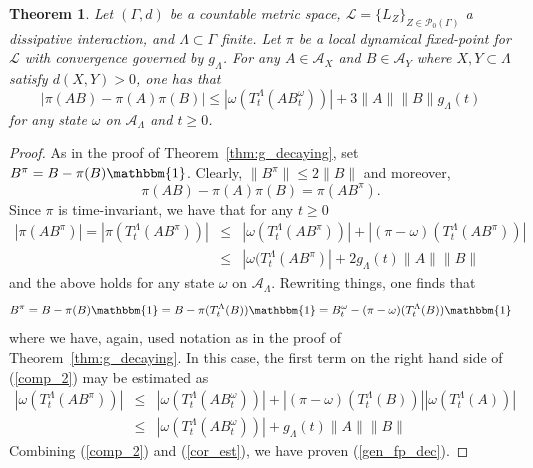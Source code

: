 \documentclass{article}
\newcommand{\A}{\mathcal{A}}
\newcommand{\one}{\mathbbm{1}}
\newcommand{\<}{\langle}
\renewcommand{\>}{\rangle}
\numberwithin{equation}{section}
\newtheorem{thm}{Theorem}[section]
\theoremstyle{definition}
\begin{document}
\begin{thm}\label{thm:steadystate1}
Let $(\Gamma, d)$ be a countable metric space, $\mathscr{L} = \{L_Z \}_{Z \in \mathcal{P}_0(\Gamma)}$ a dissipative interaction,
and $\Lambda \subset \Gamma$ finite. Let $\pi$ be a local dynamical fixed-point for $\mathscr{L}$ with 
convergence governed by $g_{\Lambda}$. For any $A \in \A_X$ and $B \in \A_Y$ where $X,Y \subset \Lambda$ 
satisfy $d(X,Y) >0$, one has that
\begin{equation} \label{gen_fp_dec}
            |\pi(AB) - \pi(A) \pi(B)| \leq  | \omega(T_t^{\Lambda}(AB_t^{\omega}))| + 3 \| A \| \| B \| g_{\Lambda}(t) 
\end{equation}
for any state $\omega$ on $\A_{\Lambda}$ and $t \geq 0$.
\end{thm}
\begin{proof}
As in the proof of Theorem~\ref{thm:g_decaying}, set $B^\pi = B- \pi(B)\one$. Clearly, $\|B^\pi\|\le 2 \|B\|$ and moreover,
\begin{equation}
\pi(AB) - \pi(A) \pi(B) = \pi(AB^\pi).
\end{equation}
Since $\pi$ is time-invariant, we have that for any $t \geq 0$ 
\begin{eqnarray} \label{comp_2}
| \pi(AB^\pi)|  = | \pi(T_t^{\Lambda}(AB^\pi))| & \leq & | \omega(T_t^{\Lambda}(AB^\pi))| + | (\pi - \omega)(T_t^{\Lambda}(AB^\pi))| \nonumber \\
& \leq &  | \omega(T_t^{\Lambda}(AB^\pi)| + 2 g_{\Lambda}(t) \| A \| \| B \|  
\end{eqnarray}
and the above holds for any state $\omega$ on $\A_{\Lambda}$.
Rewriting things, one finds that 
\begin{equation}
B^\pi = B - \pi(B) \one = B - \pi(T_t^{\Lambda}(B)) \one = B_t^{\omega} - (\pi - \omega )(T_t^{\Lambda}(B)) \one
\end{equation}
where we have, again, used notation as in the proof of Theorem~\ref{thm:g_decaying}. 
In this case, the first term on the right hand side of (\ref{comp_2}) may be estimated as
\begin{eqnarray} \label{cor_est}
 | \omega(T_t^{\Lambda}(AB^\pi))| & \leq &  | \omega(T_t^{\Lambda}(AB_t^{\omega}))| + |(\pi - \omega)(T_t^{\Lambda}(B))| | \omega(T_t^{\Lambda}(A))|  \nonumber \\
 & \leq & | \omega(T_t^{\Lambda}(AB_t^{\omega}))| +g_{\Lambda}(t) \| A \| \| B \|
\end{eqnarray}
Combining (\ref{comp_2}) and (\ref{cor_est}), we have proven (\ref{gen_fp_dec}). 
\end{proof}
\end{document}
